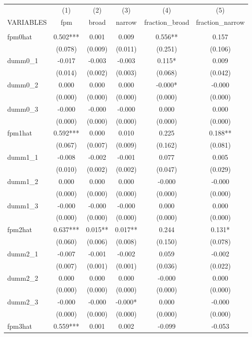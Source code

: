 \documentclass[]{article}
\begin{document}
\begin{tabular}{lccccc} \hline
 & (1) & (2) & (3) & (4) & (5) \\
VARIABLES & fpm & broad & narrow & fraction\_broad & fraction\_narrow \\ \hline
 &  &  &  &  &  \\
fpm0hat & 0.502*** & 0.001 & 0.009 & 0.556** & 0.157 \\
 & (0.078) & (0.009) & (0.011) & (0.251) & (0.106) \\
dumm0\_1 & -0.017 & -0.003 & -0.003 & 0.115* & 0.009 \\
 & (0.014) & (0.002) & (0.003) & (0.068) & (0.042) \\
dumm0\_2 & 0.000 & 0.000 & 0.000 & -0.000* & -0.000 \\
 & (0.000) & (0.000) & (0.000) & (0.000) & (0.000) \\
dumm0\_3 & -0.000 & -0.000 & -0.000 & 0.000 & 0.000 \\
 & (0.000) & (0.000) & (0.000) & (0.000) & (0.000) \\
fpm1hat & 0.592*** & 0.000 & 0.010 & 0.225 & 0.188** \\
 & (0.067) & (0.007) & (0.009) & (0.162) & (0.081) \\
dumm1\_1 & -0.008 & -0.002 & -0.001 & 0.077 & 0.005 \\
 & (0.010) & (0.002) & (0.002) & (0.047) & (0.029) \\
dumm1\_2 & 0.000 & 0.000 & 0.000 & -0.000 & -0.000 \\
 & (0.000) & (0.000) & (0.000) & (0.000) & (0.000) \\
dumm1\_3 & -0.000 & -0.000 & -0.000 & 0.000 & 0.000 \\
 & (0.000) & (0.000) & (0.000) & (0.000) & (0.000) \\
fpm2hat & 0.637*** & 0.015** & 0.017** & 0.244 & 0.131* \\
 & (0.060) & (0.006) & (0.008) & (0.150) & (0.078) \\
dumm2\_1 & -0.007 & -0.001 & -0.002 & 0.059 & -0.002 \\
 & (0.007) & (0.001) & (0.001) & (0.036) & (0.022) \\
dumm2\_2 & 0.000 & 0.000 & 0.000 & -0.000 & 0.000 \\
 & (0.000) & (0.000) & (0.000) & (0.000) & (0.000) \\
dumm2\_3 & -0.000 & -0.000 & -0.000* & 0.000 & -0.000 \\
 & (0.000) & (0.000) & (0.000) & (0.000) & (0.000) \\
fpm3hat & 0.559*** & 0.001 & 0.002 & -0.099 & -0.053 \\

\end{tabular}
\end{document}

